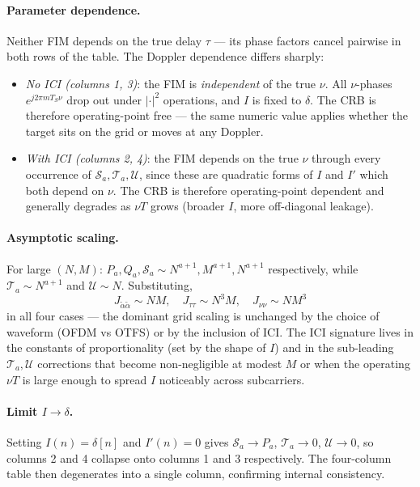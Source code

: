 \documentclass[11pt]{article}
\begin{document}
\paragraph{Parameter dependence.} Neither FIM depends on the true
delay \(\tau\) --- its phase factors cancel pairwise in both rows of
the table. The Doppler dependence differs sharply:
\begin{itemize}
    \item \emph{No ICI (columns 1, 3)}: the FIM is \emph{independent} of
          the true \(\nu\). All \(\nu\)-phases \(e^{j2\pi mT_S\nu}\)
          drop out under \(|\cdot|^2\) operations, and \(I\) is fixed
          to \(\delta\). The CRB is therefore operating-point free
          --- the same numeric value applies whether the target sits
          on the grid or moves at any Doppler.
    \item \emph{With ICI (columns 2, 4)}: the FIM depends on the
          true \(\nu\) through every occurrence of
          \(\mathcal{S}_a,\mathcal{T}_a,\mathcal{U}\), since these are
          quadratic forms of \(I\) and \(I'\) which both depend on
          \(\nu\). The CRB is therefore operating-point dependent and
          generally degrades as \(\nu T\) grows (broader \(I\), more
          off-diagonal leakage).
\end{itemize}

\paragraph{Asymptotic scaling.}
For large \((N, M)\): \(P_a, Q_a, \mathcal{S}_a \sim N^{a+1}, M^{a+1},
N^{a+1}\) respectively, while \(\mathcal{T}_a \sim N^{a+1}\) and
\(\mathcal{U}\sim N\). Substituting,
\begin{equation}
    J_{\tilde{\alpha}\tilde{\alpha}} \sim NM,
    \quad
    J_{\tau\tau} \sim N^3 M,
    \quad
    J_{\nu\nu} \sim N M^3
\end{equation}
in all four cases --- the dominant grid scaling is unchanged by the
choice of waveform (OFDM vs OTFS) or by the inclusion of ICI. The ICI
signature lives in the constants of proportionality (set by the shape
of \(I\)) and in the sub-leading \(\mathcal{T}_a,\mathcal{U}\)
corrections that become non-negligible at modest \(M\) or when the
operating \(\nu T\) is large enough to spread \(I\) noticeably across
subcarriers.

\paragraph{Limit \(I\to\delta\).} Setting
\(I(n)=\delta[n]\) and \(I'(n)=0\) gives \(\mathcal{S}_a\to P_a\),
\(\mathcal{T}_a\to 0\), \(\mathcal{U}\to 0\), so columns 2 and 4
collapse onto columns 1 and 3 respectively. The four-column table
then degenerates into a single column, confirming internal
consistency.
\end{document}

